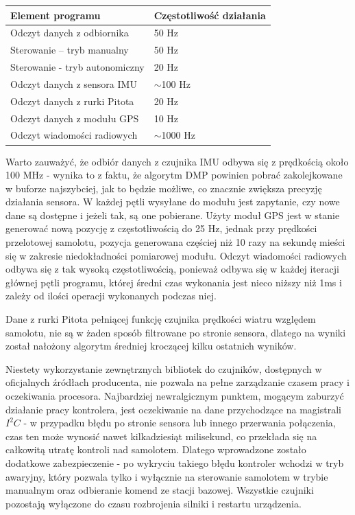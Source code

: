 \documentclass[12pt, a4paper]{article}
\begin{document}
\begin{center}

\begin{tabular}{| l | l |}
\hline
Element programu & Częstotliwość działania \\
\hline
Odczyt danych z odbiornika & 50 Hz \\
Sterowanie – tryb manualny & 50 Hz \\
Sterowanie - tryb autonomiczny & 20 Hz \\
Odczyt danych z sensora IMU & $\sim$100 Hz \\
Odczyt danych z rurki Pitota & 20 Hz \\
Odczyt danych z modułu GPS & 10 Hz \\
Odczyt wiadomości radiowych & $\sim$1000 Hz \\
\hline

\end{tabular}

\end{center}

Warto zauważyć, że odbiór danych z czujnika IMU odbywa się z prędkością około 100 MHz - wynika to z faktu, że algorytm DMP powinien pobrać zakolejkowane w buforze najszybciej, jak to będzie możliwe, co znacznie zwiększa precyzję działania sensora. W każdej pętli wysyłane do modułu jest zapytanie, czy nowe dane są dostępne i jeżeli tak, są one pobierane. Użyty moduł GPS jest w stanie generować nową pozycję z częstotliwością do 25 Hz, jednak przy prędkości przelotowej samolotu, pozycja generowana częściej niż 10 razy na sekundę mieści się w zakresie niedokładności pomiarowej modułu. Odczyt wiadomości radiowych odbywa się z tak wysoką częstotliwością, ponieważ odbywa się w każdej iteracji głównej pętli programu, której średni czas wykonania jest nieco niższy niż 1ms i zależy od ilości operacji wykonanych podczas niej.


Dane z rurki Pitota pełniącej funkcję czujnika prędkości wiatru względem samolotu, nie są w żaden sposób filtrowane po stronie sensora, dlatego na wyniki został nałożony algorytm średniej kroczącej kilku ostatnich wyników.

Niestety wykorzystanie zewnętrznych bibliotek do czujników, dostępnych w oficjalnych źródłach producenta, nie pozwala na pełne zarządzanie czasem pracy i oczekiwania procesora. Najbardziej newralgicznym punktem, mogącym zaburzyć działanie pracy kontrolera, jest oczekiwanie na dane przychodzące na magistrali $I^2C$ - w przypadku błędu po stronie sensora lub innego przerwania połączenia, czas ten może wynosić nawet kilkadziesiąt milisekund, co przekłada się na całkowitą utratę kontroli nad samolotem. Dlatego wprowadzone zostało dodatkowe zabezpieczenie - po wykryciu takiego błędu kontroler wchodzi w tryb awaryjny, który pozwala tylko i wyłącznie na sterowanie samolotem w trybie manualnym oraz odbieranie komend ze stacji bazowej. Wszystkie czujniki pozostają wyłączone do czasu rozbrojenia silniki i restartu urządzenia.
\end{document}
